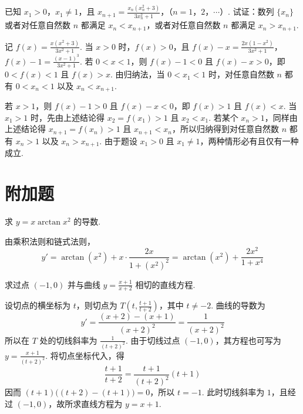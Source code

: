 \documentclass[UTF8,a4paper,oneside,11pt]{ctexbook}
\begin{document}
\begin{problem}

已知 \(x_1 > 0\)，\(x_1 \neq 1\)，且 \(x_{n+1} = \frac{x_n(x_n^2 + 3)}{3x_n^2 + 1}\)，（\(n = 1\)，\(2\)，\(\cdots\)）. 试证：数列 \(\{x_n\}\) 或者对任意自然数 \(n\) 都满足 \(x_n < x_{n+1}\)，或者对任意自然数 \(n\) 都满足 \(x_n > x_{n+1}\).
\end{problem}

\begin{solution}
记 \(f(x)=\frac{x(x^2+3)}{3x^2+1}\). 当 \(x>0\) 时，\(f(x)>0\)，且
\(f(x)-x=\frac{2x(1-x^2)}{3x^2+1}\)，\(f(x)-1=\frac{(x-1)^3}{3x^2+1}\).
若 \(0<x<1\)，则 \(f(x)-1<0\) 且 \(f(x)-x>0\)，即 \(0<f(x)<1\) 且 \(f(x)>x\). 由归纳法，当 \(0<x_1<1\) 时，对任意自然数 \(n\) 都有 \(0<x_n<1\) 以及 \(x_n<x_{n+1}\).

若 \(x>1\)，则 \(f(x)-1>0\) 且 \(f(x)-x<0\)，即 \(f(x)>1\) 且 \(f(x)<x\). 当 \(x_1>1\) 时，先由上述结论得 \(x_2=f(x_1)>1\) 且 \(x_2<x_1\). 若某个 \(x_n>1\)，同样由上述结论得 \(x_{n+1}=f(x_n)>1\) 且 \(x_{n+1}<x_n\)，所以归纳得到对任意自然数 \(n\) 都有 \(x_n>1\) 以及 \(x_n>x_{n+1}\). 由于题设 \(x_1>0\) 且 \(x_1\neq1\)，两种情形必有且仅有一种成立.
\end{solution}


\section{附加题}

\begin{problem}

求 \(y = x \arctan x^2\) 的导数.
\end{problem}

\begin{solution}
由乘积法则和链式法则，
\[
y'=\arctan\left(x^2\right)+x\cdot\frac{2x}{1+(x^2)^2}=\arctan\left(x^2\right)+\frac{2x^2}{1+x^4}
\]
\end{solution}

\begin{problem}

求过点 \((-1,0)\) 并与曲线 \(y = \frac{x + 1}{x + 2}\) 相切的直线方程.
\end{problem}

\begin{solution}
设切点的横坐标为 \(t\)，则切点为 \(T\left(t,\frac{t+1}{t+2}\right)\)，其中 \(t\neq-2\). 曲线的导数为
\[
y'=\frac{(x+2)-(x+1)}{(x+2)^2}=\frac{1}{(x+2)^2}
\]
所以在 \(T\) 处的切线斜率为 \(\frac{1}{(t+2)^2}\). 由于切线过点 \((-1,0)\)，其方程也可写为 \(y=\frac{x+1}{(t+2)^2}\). 将切点坐标代入，得
\[
\frac{t+1}{t+2}=\frac{t+1}{(t+2)^2}(t+1)
\]
因而 \((t+1)\bigl((t+2)-(t+1)\bigr)=0\)，所以 \(t=-1\). 此时切线斜率为 \(1\)，且经过 \((-1,0)\)，故所求直线方程为 \(y=x+1\).
\end{solution}

\end{document}
